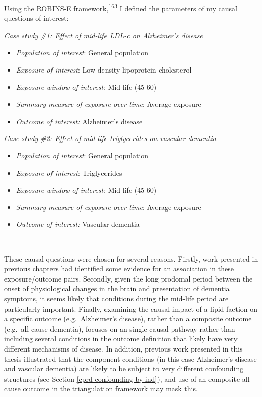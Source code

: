 \documentclass[a4paper, twoside]{templates/ociamthesis}
\providecommand{\tightlist}{%
  \setlength{\itemsep}{0pt}\setlength{\parskip}{0pt}}
\begin{document}
Using the ROBINS-E framework,\textsuperscript{\protect\hyperlink{ref-morganr2020}{163}} I defined the parameters of my causal questions of interest:

\emph{Case study \#1: Effect of mid-life LDL-c on Alzheimer's disease}

\begin{itemize}
\tightlist
\item
  \emph{Population of interest}: General population
\item
  \emph{Exposure of interest}: Low density lipoprotein cholesterol
\item
  \emph{Exposure window of interest}: Mid-life (45-60)
\item
  \emph{Summary measure of exposure over time}: Average exposure
\item
  \emph{Outcome of interest:} Alzheimer's disease
\end{itemize}

\emph{Case study \#2: Effect of mid-life triglycerides on vascular dementia}

\begin{itemize}
\tightlist
\item
  \emph{Population of interest}: General population
\item
  \emph{Exposure of interest}: Triglycerides
\item
  \emph{Exposure window of interest}: Mid-life (45-60)
\item
  \emph{Summary measure of exposure over time}: Average exposure
\item
  \emph{Outcome of interest:} Vascular dementia
\end{itemize}

~

These causal questions were chosen for several reasons. Firstly, work presented in previous chapters had identified some evidence for an association in these exposure/outcome pairs. Secondly, given the long prodomal period between the onset of physiological changes in the brain and presentation of dementia symptoms, it seems likely that conditions during the mid-life period are particularly important. Finally, examining the causal impact of a lipid faction on a specific outcome (e.g.~Alzheimer's disease), rather than a composite outcome (e.g.~all-cause dementia), focuses on an single causal pathway rather than including several conditions in the outcome definition that likely have very different mechanisms of disease. In addition, previous work presented in this thesis illustrated that the component conditions (in this case Alzheimer's disease and vascular dementia) are likely to be subject to very different confounding structures (see Section \ref{cprd-confounding-by-ind}), and use of an composite all-cause outcome in the triangulation framework may mask this.
\end{document}
